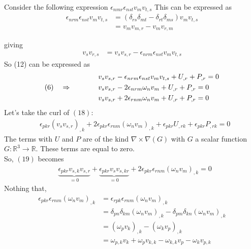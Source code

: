Consider the following expression $\epsilon_{nmr}\epsilon_{nst}v_mv_{t,s}$
This can be expressed as 
\begin{align}
\epsilon_{nrm}\epsilon_{nst}v_mv_{t,s}&=\left(\delta_{rs}\delta_{mt}-\delta_{rt}\delta_{ms}\right)v_mv_{t,s}\\
&=v_mv_{m,r}-v_mv_{r,m}
\end{align}

giving
\begin{align}
v_sv_{r,s}&= v_sv_{s,r}-\epsilon_{nrm}\epsilon_{nst}v_mv_{t,s}
\end{align}
So (12) can be expressed as 
\begin{align}
&v_sv_{s,r}-\epsilon_{nrm}\epsilon_{nst}v_mv_{t,s} + U_{,r} + P_{,r}=0\\
\text{(6)}\quad\Rightarrow\quad\quad\quad\quad &v_sv_{s,r}-2\epsilon_{nrm}\omega_nv_m + U_{,r} + P_{,r}=0\\
&v_sv_{s,r}+2\epsilon_{rnm}\omega_nv_m + U_{,r} + P_{,r}=0
\end{align}
Let's take the curl of $(18)$:
\begin{align}
&\epsilon_{pkr}\left(v_sv_{s,r}\right)_{,k}+2\epsilon_{pkr}\epsilon_{rnm}\left(\omega_nv_m\right)_{,k} + \epsilon_{pkr}U_{,rk} + \epsilon_{pkr}P_{,rk}=0
\end{align}
The terms with $U$ and $P$ are of the kind $\nabla\times\nabla(G)$ with $G$ a scalar function $G:\mathbb{R}^3\rightarrow \mathbb{R}$. These terms are equal to zero.\\ 
So, $(19)$ becomes 
\begin{align}
&\underbrace{\epsilon_{pkr}v_{s,k}v_{s,r}}_{=0}+\underbrace{\epsilon_{pkr}v_sv_{s,kr}}_{=0}+2\epsilon_{pkr}\epsilon_{rnm}\left(\omega_nv_m\right)_{,k} =0
\end{align}
Nothing that, 
\begin{align}
\epsilon_{pkr}\epsilon_{rnm}\left(\omega_nv_m\right)_{,k} 
&=\epsilon_{rpk}\epsilon_{rnm}\left(\omega_nv_m\right)_{,k}\\
&=\delta_{pn}\delta_{km}\left(\omega_nv_m\right)_{,k}-\delta_{pm}\delta_{kn}\left(\omega_nv_m\right)_{,k}\\
&=\left(\omega_pv_k\right)_{,k}-\left(\omega_kv_p\right)_{,k}\\
&=\omega_{p,k}v_k+\omega_pv_{k,k}-\omega_{k,k}v_p-\omega_kv_{p,k}
\end{align}

